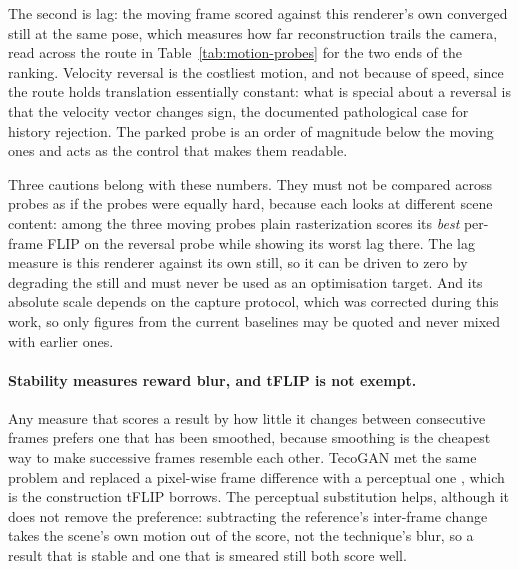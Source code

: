 The second is lag: the moving frame scored against this renderer's own converged still at the same
pose, which measures how far reconstruction trails the camera, read across the route in
Table~\ref{tab:motion-probes} for the two ends of the ranking. Velocity reversal is the costliest
motion, and not because of speed, since the route holds translation essentially constant: what is
special about a reversal is that the velocity vector changes sign, the documented pathological case
for history rejection. The parked probe is an order of magnitude below the moving ones and acts as
the control that makes them readable.

\begin{table}[tbp]
\caption[Stability and lag per route probe]{The same two temporal measures broken down by probe point,
for the ends of the ranking. Values are not compared across columns: each probe looks at different
content, so the difference between them is mostly a difference in what is on screen.}
\label{tab:motion-probes}
\centering

\end{table}

Three cautions belong with these numbers. They must not be compared across probes as if the probes
were equally hard, because each looks at different scene content: among the three moving probes plain
rasterization scores its \emph{best} per-frame FLIP on the reversal probe while showing its worst lag
there. The lag measure is
this renderer against its own still, so it can be driven to zero by degrading the still and must never
be used as an optimisation target. And its absolute scale depends on the capture protocol, which was
corrected during this work, so only figures from the current baselines may be quoted and never mixed
with earlier ones.

\paragraph{Stability measures reward blur, and tFLIP is not exempt.} Any measure that scores a result
by how little it changes between consecutive frames prefers one that has been smoothed, because
smoothing is the cheapest way to make successive frames resemble each other. TecoGAN met the same
problem and replaced a pixel-wise frame difference with a perceptual one \cite{chu2020tecogan}, which
is the construction tFLIP borrows. The perceptual substitution helps, although it does not remove the
preference: subtracting the reference's inter-frame change takes the scene's own motion out of the
score, not the technique's blur, so a result that is stable and one that is smeared still both score
well.

